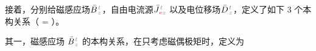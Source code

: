 接着，分别给磁感应场$\bar{B}^{\;\!\textcolor{gray}{t}}_{\;\!\textcolor{gray}{z}}$，自由电流源$\bar{J}^{\;\!\textcolor{gray}{t}}_{\;\!\textcolor{Maroon}{\text{e}}\textcolor{gray}{z}}$ 以及电位移场$\bar{D}^{\;\!\textcolor{gray}{t}}_{\;\!\textcolor{gray}{z}}$，定义了如下 3 个本构关系（\textcolor{Maroon}{} = \textcolor{Maroon}{}）。

其一，磁感应场 $\bar{B}^{\;\!\textcolor{gray}{t}}_{\;\!\textcolor{gray}{z}}$ 的本构关系，在只考虑磁偶极矩时，定义为
\begin{subequations} \label{eq:cr-b}
\begin{align}

\end{align}
\end{subequations}
